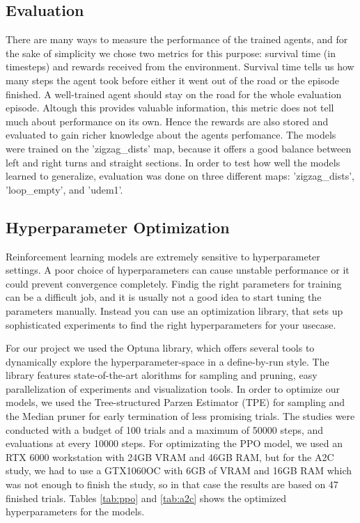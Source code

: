 \documentclass{article}
\begin{document}
\subsection{\normalsize{Evaluation}}
There are many ways to measure the performance of the trained agents, and for the sake of simplicity we chose two metrics for this purpose: survival time (in timesteps) and rewards received from the environment. Survival time tells us how many steps the agent took before either it went out of the road or the episode finished. A well-trained agent should stay on the road for the whole evaluation episode. 
Altough this provides valuable information, this metric does not tell much about performance on its own. Hence the rewards are also stored and evaluated to gain richer knowledge about the agents perfomance. The models were trained on the 'zigzag\_dists' map, because it offers a good balance between left and right turns and straight sections. In order to test how well the models learned to generalize, evaluation was done on three different maps: 'zigzag\_dists', 'loop\_empty', and 'udem1'.

\subsection{\normalsize{Hyperparameter Optimization}}
Reinforcement learning models are extremely sensitive to hyperparameter settings. A poor choice of hyperparameters can cause unstable performance or it could prevent convergence completely. Findig the right parameters for training can be a difficult job, and it is usually not a good idea to start tuning the parameters manually. Instead you can use an optimization library, that sets up sophisticated experiments to find the right hyperparameters for your usecase.

For our project we used the Optuna library, which offers several tools to dynamically explore the hyperparameter-space in a define-by-run style. The library features state-of-the-art alorithms for sampling and pruning, easy parallelization of experiments and visualization tools. In order to optimize our models, we used the Tree-structured Parzen Estimator (TPE) for sampling and the Median pruner for early termination of less promising trials. 
The studies were conducted with a budget of 100 trials and a maximum of 50000 steps, and evaluations at every 10000 steps. For optimizating the PPO model, we used an RTX 6000 workstation with 24GB VRAM and 46GB RAM, but for the A2C study, we had to use a GTX1060OC with 6GB of VRAM and 16GB RAM which was not enough to finish the study, so in that case the results are based on 47 finished trials. Tables \ref{tab:ppo} and \ref{tab:a2c} shows the optimized hyperparameters for the models.
\end{document}
